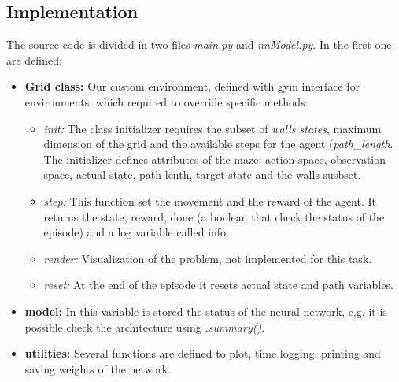 \subsection{Implementation}
The source code is divided in two files \textit{main.py} and \textit{nnModel.py}.
In the first one are defined:
\begin{itemize}
    \item \textbf{Grid class: }Our custom environment, defined with gym interface for environments, which required to override specific methods: 
    \begin{itemize}
        \item \textit{init: }The class initializer requires the subset of \textit{walls states}, maximum dimension of the grid and the available steps for the agent (\textit{path\_length}. 
        The initializer defines attributes of the maze: action space, observation space, actual state, path lenth, target state and the walls susbset.
        \item \textit{step: }This function set the movement and the reward of the agent. It returns the state, reward, done (a boolean that check the status of the episode) and a log variable called info.
        \item \textit{render: }Visualization of the problem, not implemented for this task.
        \item \textit{reset: }At the end of the episode it resets actual state and path variables.
        \end{itemize}
    \item \textbf{model: }In this variable is stored the status of the neural network, e.g. it is possible check the architecture using\textit{ .summary()}. 
    \item \textbf{utilities: }Several functions are defined to plot, time logging, printing and saving weights of the network.

\end{itemize}


